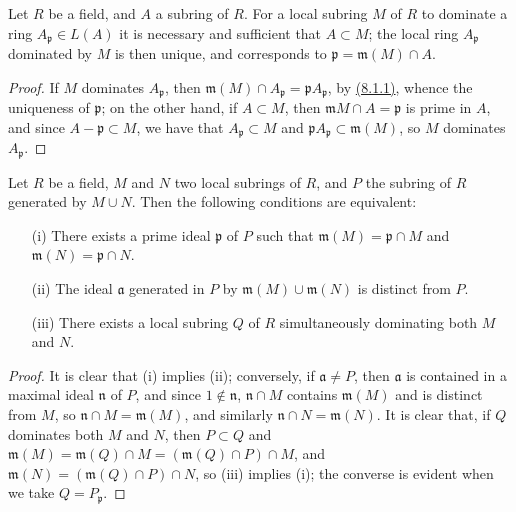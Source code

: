 \begin{lem}[8.1.3]
\label{lem-1.8.1.3}
Let $R$ be a field, and $A$ a subring of $R$. For a
local subring $M$ of $R$ to dominate a ring $A_\mathfrak{p}\in L(A)$ it is
necessary and sufficient that $A\subset M$; the local ring $A_\mathfrak{p}$
dominated by $M$ is then unique, and corresponds to
$\mathfrak{p}=\mathfrak{m}(M)\cap A$.
\end{lem}

\begin{proof}
\label{proof-lem-1.8.1.3}
If $M$ dominates $A_\mathfrak{p}$, then
$\mathfrak{m}(M)\cap A_\mathfrak{p}=\mathfrak{p}A_\mathfrak{p}$,
by \hyperref[lem-1.8.1.1]{(8.1.1)}, whence the uniqueness of $\mathfrak{p}$; on the other hand,
if $A\subset M$, then $\mathfrak{m}M\cap A=\mathfrak{p}$ is prime in $A$, and since
$A-\mathfrak{p}\subset M$, we have that $A_\mathfrak{p}\subset M$ and
$\mathfrak{p}A_\mathfrak{p}\subset\mathfrak{m}(M)$, so $M$ dominates
$A_\mathfrak{p}$.
\end{proof}

\begin{lem}[8.1.4]
\label{lem-1.8.1.4}
Let $R$ be a field, $M$ and $N$ two local
subrings of $R$, and $P$ the subring of $R$ generated by $M\cup N$. Then the
following conditions are equivalent:
\begin{itemize}
  \item[{\rm(i)}] There exists a prime ideal $\mathfrak{p}$ of $P$ such that
    $\mathfrak{m}(M)=\mathfrak{p}\cap M$ and $\mathfrak{m}(N)=\mathfrak{p}\cap N$.
  \item[{\rm(ii)}] The ideal $\mathfrak{a}$ generated in $P$ by $\mathfrak{m}(M)\cup\mathfrak{m}(N)$ is
    distinct from $P$.
  \item[{\rm(iii)}] There exists a local subring $Q$ of $R$ simultaneously dominating both $M$ and $N$.
\end{itemize}
\end{lem}

\begin{proof}
\label{proof-lem-1.8.1.4}
It is clear that (i) implies (ii); conversely, if $\mathfrak{a}\neq P$, then
$\mathfrak{a}$ is contained in a maximal ideal $\mathfrak{n}$ of $P$, and since
$1\not\in\mathfrak{n}$, $\mathfrak{n}\cap M$ contains $\mathfrak{m}(M)$ and is
distinct from $M$, so $\mathfrak{n}\cap M=\mathfrak{m}(M)$, and similarly
$\mathfrak{n}\cap N=\mathfrak{m}(N)$. It is clear that, if $Q$ dominates both
$M$ and $N$, then $P\subset Q$ and
$\mathfrak{m}(M)=\mathfrak{m}(Q)\cap M=(\mathfrak{m}(Q)\cap P)\cap M$, and
$\mathfrak{m}(N)=(\mathfrak{m}(Q)\cap P)\cap N$, so (iii) implies (i); the converse
is evident when we take $Q=P_\mathfrak{p}$.
\end{proof}

